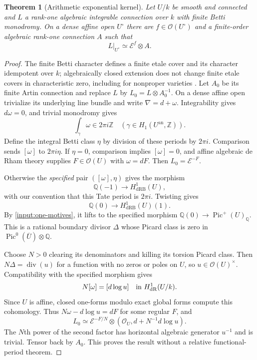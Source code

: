 \documentclass[11pt]{article}
\numberwithin{equation}{section}
\newtheorem{theorem}{Theorem}[section]
\theoremstyle{definition}
\theoremstyle{remark}
\newcommand{\Q}{\mathbb Q}
\newcommand{\Ocal}{\mathcal O}
\newcommand{\Ecal}{\mathcal E}
\newcommand{\dR}{\mathrm{dR}}
\newcommand{\dRB}{\mathrm{dRB}}
\begin{document}
\begin{theorem}[Arithmetic exponential kernel]\label{thm:kernel}\label{thm:arithmetic-kernel}
Let $U/k$ be smooth and connected and $L$ a rank-one algebraic integrable
connection over $k$ with finite Betti monodromy. On a dense affine open
$U^\circ$ there are $f\in\Ocal(U^\circ)$ and a finite-order algebraic
rank-one connection $A$ such that
\[
 L|_{U^\circ}\simeq\Ecal^f\otimes A.
\]
\end{theorem}
\begin{proof}
The finite Betti character defines a finite etale cover and its character
idempotent over $k$; algebraically closed extension does not change finite
etale covers in characteristic zero, including for nonproper varieties
\cite[Remark~3.3(c)]{MilneEtale}. Let $A_0$ be its finite Artin
connection and replace $L$ by $L_0=L\otimes A_0^{-1}$. On a dense affine
open trivialize its underlying line bundle and write $\nabla=d+\omega$.
Integrability gives $d\omega=0$, and trivial monodromy gives
\[
 \int_\gamma\omega\in2\pi i\mathbb Z
 \quad(\gamma\in H_1(U^{\mathrm{an}},\mathbb Z)).
\]
Define the integral Betti class $\eta$ by division of these periods by
$2\pi i$. Comparison sends $[\omega]$ to $2\pi i\eta$. If $\eta=0$,
comparison implies $[\omega]=0$, and affine algebraic de Rham theory
supplies $F\in\Ocal(U)$ with $\omega=dF$. Then $L_0=\Ecal^{-F}$.

Otherwise the \emph{specified} pair $([\omega],\eta)$ gives the morphism
\begin{equation}\label{eq:tate-line}
 \Q(-1)\longrightarrow H^1_{\dRB}(U),
\end{equation}
with our convention that this Tate period is $2\pi i$. Twisting gives
\begin{equation}\label{eq:tate-twist}
 \Q(0)\longrightarrow H^1_{\dRB}(U)(1).
\end{equation} By \cref{input:one-motives}, it lifts to
the specified morphism $\Q(0)\to\operatorname{Pic}^{+}(U)_\Q$.
This is a rational boundary divisor $\Delta$ whose Picard class is zero
in $\operatorname{Pic}^0(\overline U)\otimes\Q$.

Choose $N>0$ clearing its denominators and killing its torsion Picard class.
Then $N\Delta=\operatorname{div}(u)$ for a function with no zeros or
poles on $U$, so $u\in\Ocal(U)^\times$. Compatibility with the specified
morphism gives
\[
 N[\omega]=[d\log u]\quad\hbox{in }H^1_{\dR}(U/k).
\]
Since $U$ is affine, closed one-forms modulo exact global forms compute
this cohomology. Thus $N\omega-d\log u=dF$ for some regular $F$, and
\[
 L_0\simeq\Ecal^{-F/N}\otimes
 (\Ocal_U,d+N^{-1}d\log u).
\]
The $N$th power of the second factor has horizontal algebraic generator
$u^{-1}$ and is trivial. Tensor back by $A_0$. This proves the result
without a relative functional-period theorem.
\end{proof}
\end{document}
